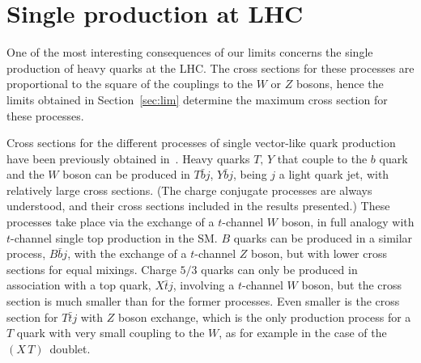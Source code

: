 \documentclass[12pt,a4paper]{article}
\newcommand{\xt}{$(X\,T)$}
\begin{document}


\section{Single production at LHC}
\label{sec:xsec}

One of the most interesting consequences of our limits concerns the single production of heavy quarks at the LHC. The cross sections for these processes are proportional to the square of the couplings to the $W$ or $Z$ bosons, hence the limits obtained in Section~\ref{sec:lim} determine the maximum cross section for these processes.

Cross sections for the different processes of single vector-like quark production have been previously obtained in~\cite{AguilarSaavedra:2009es}.
Heavy quarks $T,\,Y$ that couple to the $b$ quark and the $W$ boson can be produced in $T \bar b j$, $Y \bar b j$, being $j$ a light quark jet, with relatively large cross sections. (The charge conjugate processes are always understood, and their cross sections included in the results presented.) These processes take place via the exchange of a $t$-channel $W$ boson, in full analogy with $t$-channel single top production in the SM. $B$ quarks can be produced in a similar process, $B \bar b j$, with the exchange of a $t$-channel $Z$ boson, but with lower cross sections for equal mixings. Charge $5/3$ quarks can only be produced in association with a top quark, $X \bar t j$, involving a $t$-channel $W$ boson, but the cross section is much smaller than for the former processes. Even smaller is the cross section for $T \bar t j$ with $Z$ boson exchange, which is the only production process for a $T$ quark with very small coupling to the $W$, as for example in the case of the \xt\ doublet.
\end{document}
